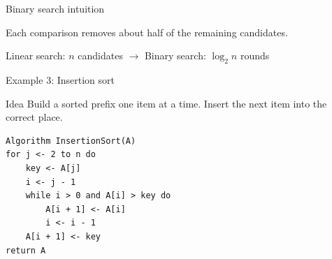 \documentclass[aspectratio=43,10pt]{beamer}
\begin{document}
\begin{frame}{Binary search intuition}
  \begin{center}
  \end{center}

  \vspace{0.5em}
  Each comparison removes about half of the remaining candidates.

  \vspace{0.5em}
  \begin{center}
    Linear search: $n$ candidates $\rightarrow$ Binary search: $\log_2 n$ rounds
  \end{center}
\end{frame}

\begin{frame}[fragile]{Example 3: Insertion sort}
\begin{block}{Idea}
Build a sorted prefix one item at a time. Insert the next item into the correct place.
\end{block}

\begin{lstlisting}[style=pseudo]
Algorithm InsertionSort(A)
for j <- 2 to n do
    key <- A[j]
    i <- j - 1
    while i > 0 and A[i] > key do
        A[i + 1] <- A[i]
        i <- i - 1
    A[i + 1] <- key
return A
\end{lstlisting}
\end{frame}
\end{document}
